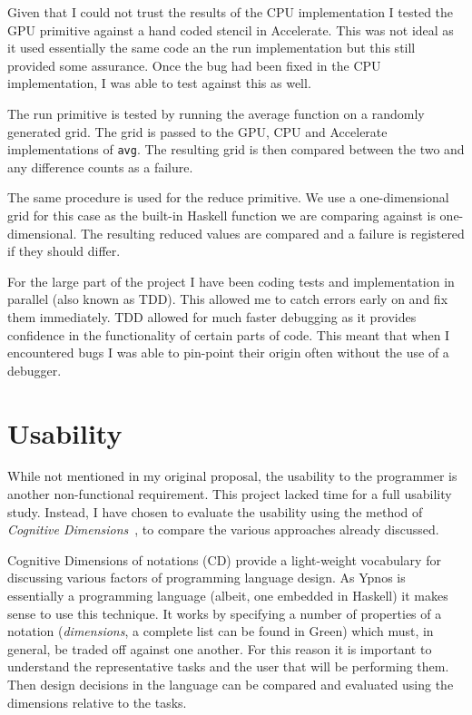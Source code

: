 \documentclass[12pt,a4paper,twoside]{scrbook}
\begin{document}
Given that I could not trust the results of the CPU implementation I tested the
GPU primitive against a hand coded stencil in Accelerate.  This was not ideal as
it used essentially the same code an the run implementation but this still
provided some assurance. Once the bug had been fixed in the CPU implementation,
I was able to test against this as well.

The run primitive is tested by running the average function on a randomly
generated grid. The grid is passed to the GPU, CPU and Accelerate
implementations of \texttt{avg}. The resulting grid is then compared between the
two and any difference counts as a failure.

The same procedure is used for the reduce primitive. We use a one-dimensional
grid for this case as the built-in Haskell function we are comparing against is
one-dimensional. The resulting reduced values are compared and a failure is
registered if they should differ.

For the large part of the project I have been coding tests and implementation in
parallel (also known as TDD). This allowed me to catch errors early on and fix
them immediately.  TDD allowed for much faster debugging as it provides
confidence in the functionality of certain parts of code. This meant that when I
encountered bugs I was able to pin-point their origin often without the use of a
debugger.

\section{Usability}

While not mentioned in my original proposal, the usability to the programmer is
another non-functional requirement. This project lacked time for a full
usability study. Instead, I have chosen to evaluate the usability using the
method of \emph{Cognitive Dimensions}~\cite{green96}, to compare the various
approaches already discussed.

Cognitive Dimensions of notations (CD) provide a light-weight vocabulary for
discussing various factors of programming language design. As Ypnos is
essentially a programming language (albeit, one embedded in Haskell) it makes
sense to use this technique. It works by specifying a number of properties of a
notation (\emph{dimensions}, a complete list can be found in
Green\cite{green96}) which must, in general, be traded off against one
another. For this reason it is important to understand the representative tasks
and the user that will be performing them. Then design decisions in the language
can be compared and evaluated using the dimensions relative to the tasks.
\end{document}
